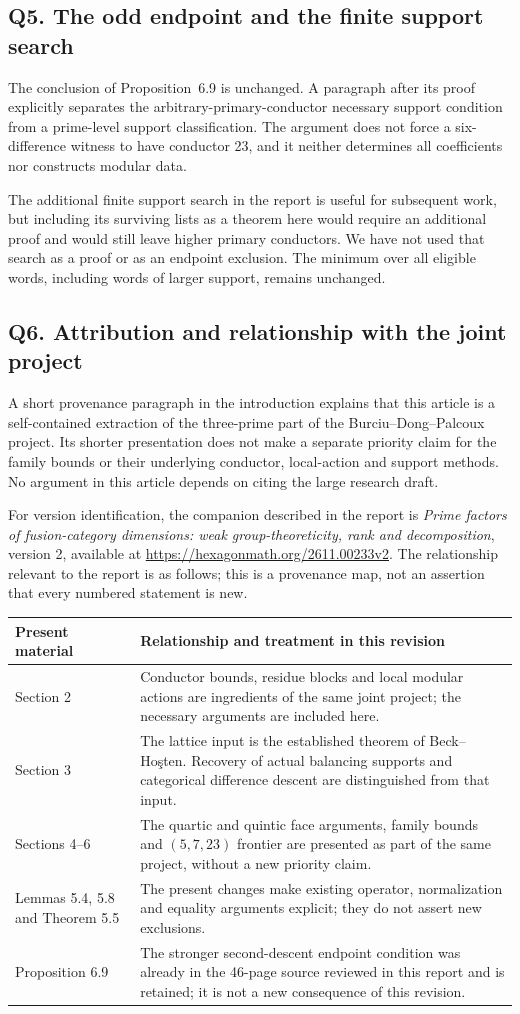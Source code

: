 \documentclass[11pt,a4paper]{article}
\newcommand{\issue}[1]{\subsection*{#1}}
\begin{document}
\issue{Q5. The odd endpoint and the finite support search}
The conclusion of Proposition~6.9 is unchanged. A paragraph after its proof explicitly separates the arbitrary-primary-conductor necessary support condition from a prime-level support classification. The argument does not force a six-difference witness to have conductor 23, and it neither determines all coefficients nor constructs modular data.

The additional finite support search in the report is useful for subsequent work, but including its surviving lists as a theorem here would require an additional proof and would still leave higher primary conductors. We have not used that search as a proof or as an endpoint exclusion. The minimum over all eligible words, including words of larger support, remains unchanged.

\issue{Q6. Attribution and relationship with the joint project}
A short provenance paragraph in the introduction explains that this article is a self-contained extraction of the three-prime part of the Burciu--Dong--Palcoux project. Its shorter presentation does not make a separate priority claim for the family bounds or their underlying conductor, local-action and support methods. No argument in this article depends on citing the large research draft.

For version identification, the companion described in the report is \emph{Prime factors of fusion-category dimensions: weak group-theoreticity, rank and decomposition}, version 2, available at
\url{https://hexagonmath.org/2611.00233v2}.
The relationship relevant to the report is as follows; this is a provenance map, not an assertion that every numbered statement is new.

\begin{center}\small
\begin{tabular}{>{\raggedright\arraybackslash}p{}>{\raggedright\arraybackslash}p{}}
\toprule Present material & Relationship and treatment in this revision\\\midrule
Section 2 & Conductor bounds, residue blocks and local modular actions are ingredients of the same joint project; the necessary arguments are included here.\\[3pt]
Section 3 & The lattice input is the established theorem of Beck--Ho\c{s}ten. Recovery of actual balancing supports and categorical difference descent are distinguished from that input.\\[3pt]
Sections 4--6 & The quartic and quintic face arguments, family bounds and $(5,7,23)$ frontier are presented as part of the same project, without a new priority claim.\\[3pt]
Lemmas 5.4, 5.8 and Theorem 5.5 & The present changes make existing operator, normalization and equality arguments explicit; they do not assert new exclusions.\\[3pt]
Proposition 6.9 & The stronger second-descent endpoint condition was already in the 46-page source reviewed in this report and is retained; it is not a new consequence of this revision.\\\bottomrule
\end{tabular}
\end{center}
\end{document}
